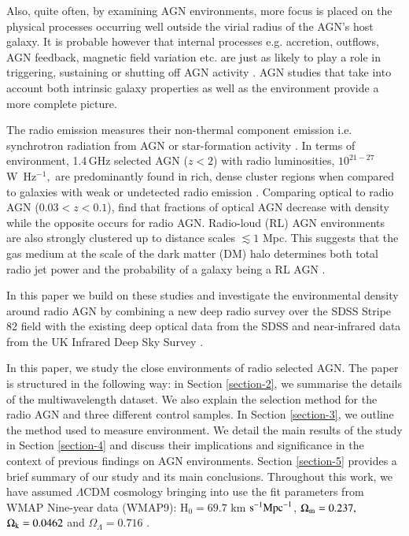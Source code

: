  Also, quite often, by examining AGN environments, more focus is placed on the physical processes occurring well outside the virial radius of the AGN's host galaxy. It is probable however that internal processes e.g. accretion, outflows, AGN feedback, magnetic field variation etc. are just as likely to play a role in triggering, sustaining or shutting off AGN activity \citep{maia2004,best2004,draper2012}. AGN studies that take into account both intrinsic galaxy properties as well as the environment provide a more complete picture. 

The radio emission measures their non-thermal component emission i.e. synchrotron radiation from AGN or star-formation activity \citep{antonucci1993}. In terms of environment, 1.4\,GHz selected AGN ($z < 2$) with radio luminosities, $10^{21-27}$\,W~Hz$^{-1},$ are predominantly found in rich, dense cluster regions when compared to galaxies with weak or undetected radio emission \citep{malavasi2015}. Comparing optical to radio AGN ($0.03 < z < 0.1$), \citet{sabater2013} find that fractions of optical AGN decrease with density while the opposite occurs for radio AGN. Radio-loud (RL) AGN environments are also strongly clustered up to distance scales $\lesssim 1$ Mpc. This suggests that the gas medium at the scale of the dark matter (DM) halo determines both total radio jet power and the probability of a galaxy being a RL AGN \citep{donoso2010,magliocchetti2017,hale2018}.

In this paper we build on these studies and investigate the environmental density around radio AGN by combining a new deep radio survey over the SDSS Stripe 82 field with the existing deep optical data from the SDSS and near-infrared data from the UK Infrared Deep Sky Survey \citep[UKIDSS;][]{lawrence2007}. 

In this paper, we study the close environments of radio selected AGN. The paper is structured in the following way: in Section \ref{section-2}, we summarise the details of the multiwavelength dataset. We also explain the selection method for the radio AGN and three different control samples. In Section \ref{section-3}, we outline the method used to  measure environment. We detail the main results of the study in Section \ref{section-4} and discuss their implications and significance in the context of previous findings on AGN environments. Section \ref{section-5} provides a brief summary of our study and its main conclusions. Throughout this work, we have assumed $\Lambda$CDM cosmology bringing into use the fit parameters from WMAP Nine-year data (WMAP9): H$_{0} = 69.7$ km $\rm{s}^{-1} \rm{Mpc}^{-1}$, $\Omega_{\rm{m}} = 0.237,$  $\Omega_{\rm{k}} = 0.0462$ and $\Omega_{\Lambda} = 0.716$ \citep{hinshaw2013}.

